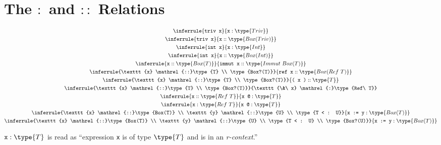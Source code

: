\documentclass{article}
\newcommand\rtypeof{\mathrel{:}}
\newcommand\ltypeof{\mathrel{::}}
\newcommand{\syntax}{\texttt}
\begin{document}

\section*{The $\rtypeof$ and $\ltypeof$ Relations}

\begin{gather}
  \inferrule{\syntax{triv x}}{\syntax{x} \rtypeof \type{Triv}}\\
  \inferrule{\syntax{triv x}}{\syntax{x} \ltypeof \type{Box(Triv)}}\\
  \inferrule{\syntax{int x}}{\syntax{x} \rtypeof \type{Int}}\\
  \inferrule{\syntax{int x}}{\syntax{x} \ltypeof \type{Box(Int)}}\\
  \inferrule{\syntax{x} \ltypeof \type{Box(T)}}{\syntax{immut\ x} \ltypeof \type{Immut\ Box(T)}}\\
  \inferrule{\syntax{x} \ltypeof \type{T} \\ \type{Box?(T)}}{\syntax{ref\ x} \ltypeof \type{Box(Ref\ T)}}\\
  \inferrule{\syntax{x} \ltypeof \type{T} \\ \type{Box?(T)}}{\syntax{(\ x\ )} \ltypeof \type{T}}\\
  \inferrule{\syntax{x} \ltypeof \type{T} \\ \type{Box?(T)}}{\syntax{\&\ x} \rtypeof \type{Ref\ T}}\\
  \inferrule{\syntax{x} \ltypeof \type{Ref\ T}}{\syntax{x\ @} \rtypeof \type{T}}\\
  \inferrule{\syntax{x} \rtypeof \type{Ref\ T}}{\syntax{x\ @} \rtypeof \type{T}}\\
  \inferrule{\syntax{x} \ltypeof \type{Box(T)} \\ \syntax{y} \ltypeof \type{U} \\ \type{T < : U}}{\syntax{x := y}:\type{Box(T)}}\\
  \inferrule{\syntax{x} \ltypeof \type{Box(T)} \\ \syntax{y} \ltypeof \type{U} \\ \type{T < : U} \\ \type{Box?(U)}}{\syntax{x := y}:\type{Box(T)}}
\end{gather}

$\syntax{x} : \type{T}$ is read as ``expression \syntax{x} is of type
$\type{T}$ and is in an \textit{r-context}.''
\end{document}
